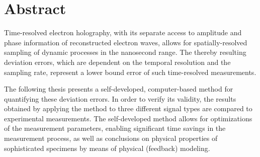 \section*{Abstract}
Time-resolved electron holography, with its separate access to amplitude and phase information of reconstructed electron waves, allows for spatially-resolved sampling of dynamic processes in the nanosecond range. The thereby resulting deviation errors, which are dependent on the temporal resolution and the sampling rate, represent a lower bound error of such time-resolved measurements.

The following thesis presents a self-developed, computer-based method for quantifying these deviation errors. In order to verify its validity, the results obtained by applying the method to three different signal types are compared to experimental measurements. The self-developed method allows for optimizations of the measurement parameters, enabling significant time savings in the measurement process, as well as conclusions on physical properties of sophisticated specimens by means of physical (feedback) modeling.

